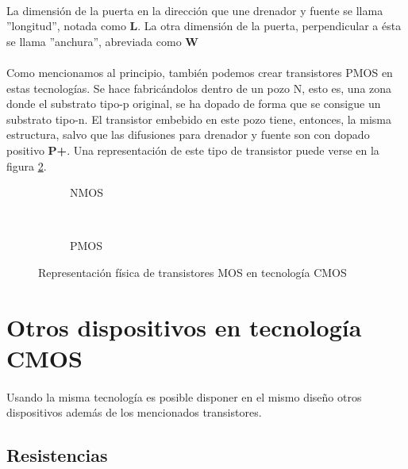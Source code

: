 \paragraph{}
La dimensión de la puerta en la dirección que une drenador y fuente se llama
''longitud'', notada como \textbf{L}. La otra dimensión de la puerta, perpendicular a ésta
se llama ''anchura'', abreviada como \textbf{W}

\paragraph{}
Como mencionamos al principio, también podemos crear transistores PMOS en estas
tecnologías. Se hace fabricándolos dentro de un pozo N, esto es, una zona
donde el substrato tipo-p original, se ha dopado de forma que se consigue un substrato
tipo-n. El transistor embebido en este pozo tiene, entonces, la misma estructura,
salvo que las difusiones para drenador y fuente son con dopado positivo \textbf{P+}.
Una representación de este tipo de transistor puede verse en la figura \ref{fig:pmos}.

\begin{figure}
	\centering
	\begin{subfigure}[b]{0.45\textwidth}
		
		\caption{NMOS}
		\label{fig:nmos}
	\end{subfigure}
	~ %
	\begin{subfigure}[b]{0.45\textwidth}
		
		\caption{PMOS}
		\label{fig:pmos}
	\end{subfigure}
	\caption{Representación física de transistores MOS en tecnología CMOS}
	\label{fig:cmos_transistors}
\end{figure}

\section{Otros dispositivos en tecnología CMOS}\label{cap:otros_dispositivos}

\paragraph{}
Usando la misma tecnología es posible disponer en el mismo diseño otros dispositivos
además de los mencionados transistores.

\subsection{Resistencias}
